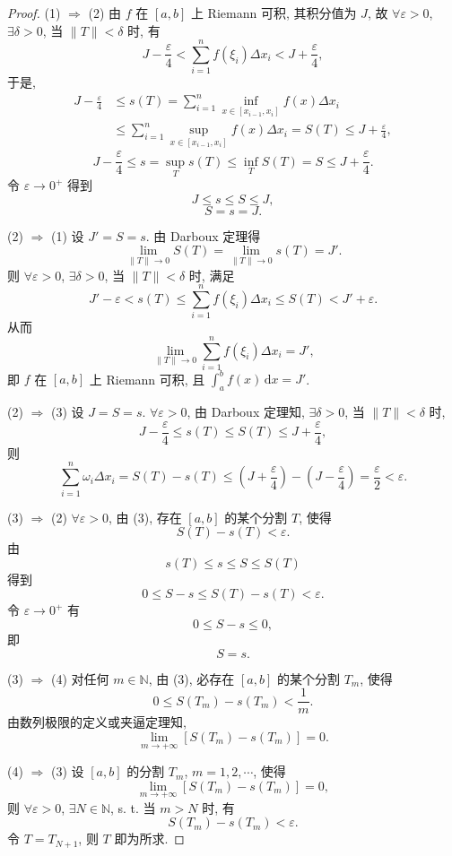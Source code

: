 \begin{proof}
(1) $\Rightarrow$ (2) 由 $f$ 在 $[a,b]$ 上 Riemann 可积, 其积分值为 $J$, 故 $\forall\varepsilon>0$, $\exists\delta>0$, 当 $\|T\|<\delta$ 时, 有
\[
J-\frac{\varepsilon}{4}<\sum_{i=1}^{n}f(\xi_{i})\Delta x_{i}<J+\frac{\varepsilon}{4},
\]
于是,
\begin{align*}
J-\frac{\varepsilon}{4}&\leqslant s(T)=\sum_{i=1}^{n}\inf_{x\in[x_{i-1},x_{i}]}f(x)\Delta x_{i}\\
&\leqslant\sum_{i=1}^{n}\sup_{x\in[x_{i-1},x_{i}]}f(x)\Delta x_{i}=S(T)\leqslant J+\frac{\varepsilon}{4},
\end{align*}
\[
J-\frac{\varepsilon}{4}\leqslant s=\sup_{T}s(T)\leqslant\inf_{T}S(T)=S\leqslant J+\frac{\varepsilon}{4}.
\]
令 $\varepsilon\to 0^{+}$ 得到
\[
J\leqslant s\leqslant S\leqslant J,
\]
\[
S=s=J.
\]

(2) $\Rightarrow$ (1) 设 $J'=S=s$. 由 Darboux 定理得
\[
\lim_{\|T\|\to 0}S(T)=\lim_{\|T\|\to 0}s(T)=J'.
\]
则 $\forall\varepsilon>0$, $\exists\delta>0$, 当 $\|T\|<\delta$ 时, 满足
\[
J'-\varepsilon<s(T)\leqslant\sum_{i=1}^{n}f(\xi_{i})\Delta x_{i}\leqslant S(T)<J'+\varepsilon.
\]
从而
\[
\lim_{\|T\|\to 0}\sum_{i=1}^{n}f(\xi_{i})\Delta x_{i}=J',
\]
即 $f$ 在 $[a,b]$ 上 Riemann 可积, 且 $\int_{a}^{b}f(x)\,\mathrm{d}x=J'$.

(2) $\Rightarrow$ (3) 设 $J=S=s$. $\forall\varepsilon>0$, 由 Darboux 定理知, $\exists\delta>0$, 当 $\|T\|<\delta$ 时,
\[
J-\frac{\varepsilon}{4}\leqslant s(T)\leqslant S(T)\leqslant J+\frac{\varepsilon}{4},
\]
则
\[
\sum_{i=1}^{n}\omega_{i}\Delta x_{i}=S(T)-s(T)\leqslant\left(J+\frac{\varepsilon}{4}\right)-\left(J-\frac{\varepsilon}{4}\right)=\frac{\varepsilon}{2}<\varepsilon.
\]

(3) $\Rightarrow$ (2) $\forall\varepsilon>0$, 由 (3), 存在 $[a,b]$ 的某个分割 $T$, 使得
\[
S(T)-s(T)<\varepsilon.
\]
由
\[
s(T)\leqslant s\leqslant S\leqslant S(T)
\]
得到
\[
0\leqslant S-s\leqslant S(T)-s(T)<\varepsilon.
\]
令 $\varepsilon\to 0^{+}$ 有
\[
0\leqslant S-s\leqslant 0,
\]
即
\[
S=s.
\]

(3) $\Rightarrow$ (4) 对任何 $m\in\mathbb{N}$, 由 (3), 必存在 $[a,b]$ 的某个分割 $T_{m}$, 使得
\[
0\leqslant S(T_{m})-s(T_{m})<\frac{1}{m}.
\]
由数列极限的定义或夹逼定理知,
\[
\lim_{m\to+\infty}\left[S(T_{m})-s(T_{m})\right]=0.
\]

(4) $\Rightarrow$ (3) 设 $[a,b]$ 的分割 $T_{m}$, $m=1,2,\cdots$, 使得
\[
\lim_{m\to+\infty}\left[S(T_{m})-s(T_{m})\right]=0,
\]
则 $\forall\varepsilon>0$, $\exists N\in\mathbb{N}$, s. t. 当 $m>N$ 时, 有
\[
S(T_{m})-s(T_{m})<\varepsilon.
\]
令 $T=T_{N+1}$, 则 $T$ 即为所求.


\end{proof}
